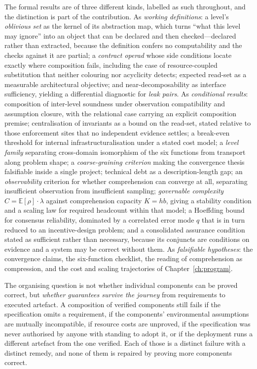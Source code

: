 \documentclass[UTF8,a4paper,11pt,openany,oneside]{ctexbook}
\begin{document}
The formal results are of three different kinds, labelled as such throughout, and the
distinction is part of the contribution. As \emph{working definitions}: a level's
\emph{oblivious set} as the kernel of its abstraction map, which turns ``what this level may
ignore'' into an object that can be declared and then checked---declared rather than extracted,
because the definition confers no computability and the checks against it are partial; a
\emph{contract operad} whose side conditions locate exactly where composition fails, including
the case of resource-coupled substitution that neither colouring nor acyclicity detects; expected
read-set as a measurable architectural objective; and near-decomposability as interface
sufficiency, yielding a differential diagnostic for \emph{leak pairs}. As \emph{conditional
results}: composition of inter-level soundness under observation compatibility and assumption
closure, with the relational case carrying an explicit composition premise; centralisation of
invariants as a bound on the read-set, stated relative to those enforcement sites that no
independent evidence settles; a break-even threshold for internal infrastructuralisation under a
stated cost model; a \emph{level family} separating cross-domain isomorphism of the six functions
from transport along problem shape; a \emph{coarse-graining criterion} making the convergence
thesis falsifiable inside a single project; technical debt as a description-length gap; an
\emph{observability} criterion for whether comprehension can converge at all, separating
insufficient observation from insufficient sampling; \emph{governable complexity}
$C=\mathbb{E}[\rho]\cdot\lambda$ against comprehension capacity $K=hb$, giving a stability
condition and a scaling law for required headcount within that model; a Hoeffding bound for
consensus reliability, dominated by a correlated error mode $q$ that is in turn reduced to an
incentive-design problem; and a consolidated assurance condition stated as sufficient rather than
necessary, because its conjuncts are conditions on evidence and a system may be correct without
them. As \emph{falsifiable hypotheses}: the convergence claims, the six-function checklist, the
reading of comprehension as compression, and the cost and scaling trajectories of
Chapter~\ref{ch:program}.

The organising question is not whether individual components can be proved correct, but
\emph{whether guarantees survive the journey} from requirements to executed artefact. A
composition of verified components still fails if the specification omits a requirement, if the
components' environmental assumptions are mutually incompatible, if resource costs are unproved,
if the specification was never authorised by anyone with standing to adopt it, or if the
deployment runs a different artefact from the one verified. Each of those is a distinct failure
with a distinct remedy, and none of them is repaired by proving more components correct.
\end{document}

